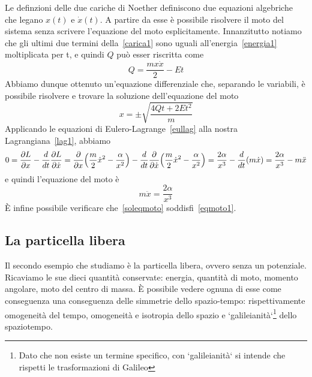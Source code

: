 \begin{example}
        Le definzioni delle due cariche di Noether definiscono due equazioni algebriche che legano $x(t)$ e $\dot x(t)$. A partire da esse è possibile risolvere il moto del sistema senza scrivere l'equazione del moto esplicitamente. Innanzitutto notiamo che gli ultimi due termini della~\eqref{carica1} sono uguali all'energia~\eqref{energia1} moltiplicata per t, e quindi $Q$ può esser riscritta come
    \begin{equation*}
        Q = \frac{m x \dot x}{2} - Et
    \end{equation*}
        Abbiamo dunque ottenuto un'equazione differenziale che, separando le variabili, è possibile risolvere e trovare la soluzione dell'equazione del moto
    \begin{equation} \label{soleqmoto}
        x = \pm \sqrt{\frac{4Qt + 2Et^2}{m}}
    \end{equation}
        Applicando le equazioni di Eulero-Lagrange~\eqref{eullag} alla nostra Lagrangiana~\eqref{lag1}, abbiamo
    \begin{equation*}
        0 = \frac{\partial L}{\partial x}  - \frac{d}{dt} \frac{\partial L}{\partial\dot x} = \frac{\partial}{\partial x} \Big(\frac{m}{2} \dot x^2 - \frac{\alpha}{x^2} \Big) - \frac{d}{dt} \frac{\partial}{\partial\dot x} \Big(\frac{m}{2} \dot x^2 - \frac{\alpha}{x^2} \Big) = \frac{2 \alpha}{x^3} - \frac{d}{dt} (m \dot x) = \frac{2 \alpha}{x^3} - m \ddot x 
    \end{equation*}
        e quindi l'equazione del moto è
    \begin{equation}\label{eqmoto1}
        m \ddot x = \frac{2 \alpha}{x^3}
    \end{equation}
        È infine possibile verificare che~\eqref{soleqmoto} soddisfi~\eqref{eqmoto1}.
    \end{example}

\subsection{La particella libera}
    Il secondo esempio che studiamo è la particella libera, ovvero senza un potenziale. Ricaviamo le sue dieci quantità conservate: energia, quantità di moto, momento angolare, moto del centro di massa. È possibile vedere ognuna di esse come conseguenza una conseguenza delle simmetrie dello spazio-tempo: rispettivamente omogeneità del tempo, omogeneità e isotropia dello spazio e `galileianità`\footnote{Dato che non esiste un termine specifico, con `galileianità` si intende che rispetti le trasformazioni di Galileo} dello spaziotempo.

